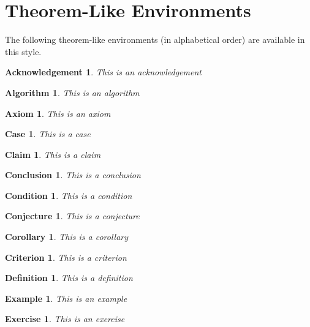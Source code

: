 \documentclass{amsbook}
\theoremstyle{plain}
\newtheorem{acknowledgement}{Acknowledgement}
\newtheorem{algorithm}{Algorithm}
\newtheorem{axiom}{Axiom}
\newtheorem{case}{Case}
\newtheorem{claim}{Claim}
\newtheorem{conclusion}{Conclusion}
\newtheorem{condition}{Condition}
\newtheorem{conjecture}{Conjecture}
\newtheorem{corollary}{Corollary}
\newtheorem{criterion}{Criterion}
\newtheorem{definition}{Definition}
\newtheorem{example}{Example}
\newtheorem{exercise}{Exercise}
\numberwithin{equation}{chapter}
\begin{document}
\section{Theorem-Like Environments}

The following theorem-like environments (in alphabetical order) are
available in this style.

\begin{acknowledgement}
This is an acknowledgement
\end{acknowledgement}

\begin{algorithm}
This is an algorithm
\end{algorithm}

\begin{axiom}
This is an axiom
\end{axiom}

\begin{case}
This is a case
\end{case}

\begin{claim}
This is a claim
\end{claim}

\begin{conclusion}
This is a conclusion
\end{conclusion}

\begin{condition}
This is a condition
\end{condition}

\begin{conjecture}
This is a conjecture
\end{conjecture}

\begin{corollary}
This is a corollary
\end{corollary}

\begin{criterion}
This is a criterion
\end{criterion}

\begin{definition}
This is a definition
\end{definition}

\begin{example}
This is an example
\end{example}

\begin{exercise}
This is an exercise
\end{exercise}
\end{document}
